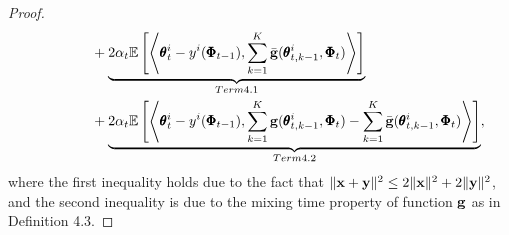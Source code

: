 \documentclass{article} %
\theoremstyle{plain}
\theoremstyle{definition}
\theoremstyle{remark}
\begin{document}
{\begin{proof}
\begin{align}
    &\qquad\qquad+\underset{\textnormal{Term {4.1}}}{\underbrace{2\alpha_t\mathbb{E}\left[\left\langle\pmb{\theta}_{t}^i-y^i(\pmb{\Phi}_{t-1}), \sum_{k=1}^K\bar{\bg}(\pmb{\theta}_{t,k-1}^i,\pmb{\Phi}_t)\right\rangle\right]}}\nonumber\allowdisplaybreaks\\
    &\qquad\qquad+\underset{\textnormal{Term {4.2}}}{\underbrace{2\alpha_t\mathbb{E}\left[\left\langle\pmb{\theta}_{t}^i-y^i(\pmb{\Phi}_{t-1}), \sum_{k=1}^K{\bg}(\pmb{\theta}_{t,k-1}^i,\pmb{\Phi}_t)-\sum_{k=1}^K\bar{\bg}(\pmb{\theta}_{t,k-1}^i,\pmb{\Phi}_t)\right\rangle\right]}},
\end{align}
where the first inequality holds due to the fact that $\|{\mathbf{x}}+{\mathbf{y}}\|^2\leq 2\|{\mathbf{x}}\|^2+2\|{\mathbf{y}}\|^2$, and the second inequality is due to the mixing time property of function ${\mathbf{g}}$ as in Definition 4.3.


\end{proof}}
\end{document}
